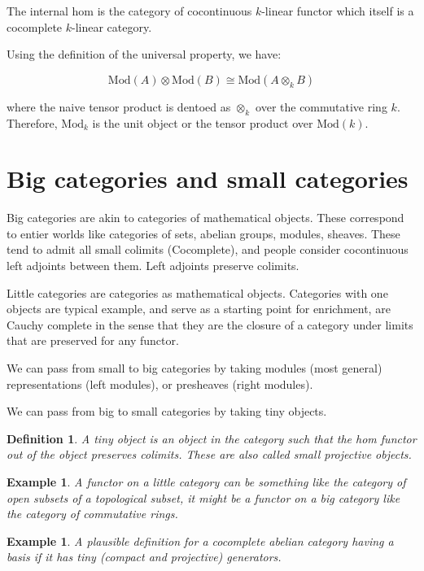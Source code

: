 \documentclass{tufte-book}
\newtheorem{definition}[theorem]{Definition}
\newtheorem{example}[theorem]{Example}
\begin{document}
The internal hom is the category of cocontinuous $k$-linear functor which itself is a cocomplete $k$-linear category.

Using the definition of the universal property, we have:

\begin{equation}
	\mathrm{Mod}(A) \otimes \mathrm{Mod}(B) \cong \mathrm{Mod}(A \otimes_k B)
\end{equation}

where the naive tensor product is dentoed as $\otimes_k$ over the commutative ring $k$. Therefore, $\mathrm{Mod}_k$ is the unit object or the tensor product over $\mathrm{Mod}(k)$.

\section{Big categories and small categories}

Big categories are akin to categories of mathematical objects. These correspond to entier worlds like categories of sets, abelian groups, modules, sheaves. These tend to admit all small colimits (Cocomplete), and people consider cocontinuous left adjoints between them. Left adjoints preserve colimits.

Little categories are categories as mathematical objects. Categories with one objects are typical example, and serve as a starting point for enrichment, are Cauchy complete in the sense that they are the closure of a category under limits that are preserved for any functor.

We can pass from small to big categories by taking modules (most general) representations (left modules), or presheaves (right modules). 

We can pass from big to small categories by taking tiny objects.

\begin{definition}
	A tiny object is an object in the category such that the hom functor out of the object preserves colimits. These are also called small projective objects.
\end{definition}

\begin{example}
	A functor on a little category can be something like the category of open subsets of a topological subset, it might be a functor on a big category like the category of commutative rings.
\end{example}

\begin{example}
	A plausible definition for a cocomplete abelian category having a basis if it has tiny (compact and projective) generators.
\end{example}
\end{document}
